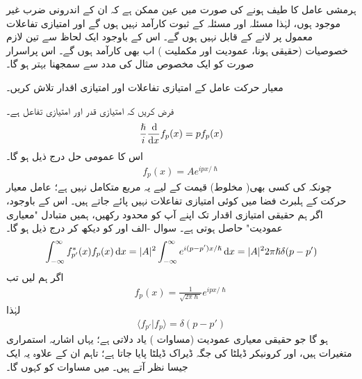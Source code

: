 ہرمشی عامل کا طیف  ہونے کی صورت میں عین ممکن ہے کہ ان کے اندرونی ضرب غیر موجود ہوں، لہٰذا مسئلہ  اور مسئلہ  کے ثبوت کارآمد نہیں ہوں گے اور امتیازی تفاعلات معمول پر لانے کے قابل نہیں ہوں گے۔ اس کے باوجود ایک لحاظ سے تین لازم خصوصیات (حقیقی ہونا، عمودیت اور مکملیت ) اب بھی کارآمد ہوں گے۔ اس پراسرار صورت کو ایک مخصوص مثال کی مدد سے سمجھنا بہتر ہو گا۔



معیار حرکت عامل کے امتیازی تفاعلات اور امتیازی اقدار تلاش کریں۔

\quad
فرض کریں کہ  امتیازی قدر اور  امتیازی تفاعل ہے۔
\begin{align}
\frac{\hslash}{i} \frac{\dif}{\dif x} f_{p}(x) = pf_{p}(x)
\end{align}
اس کا عمومی حل درج ذیل ہو گا۔
\begin{align*}
f_{p}(x) = Ae^{ipx/\hslash}
\end{align*}
چونکہ  کی کسی بھی( مخلوط) قیمت کے لیے یہ  مربع  متکامل  نہیں ہے؛ عامل معیار حرکت کے ہلبرٹ فضا میں کوئی امتیازی تفاعلات نہیں پائے جاتے ہیں۔ اس کے باوجود، اگر ہم حقیقی امتیازی اقدار تک اپنے آپ کو محدود رکھیں، ہمیں متبادل "معیاری عمودیت" حاصل ہوتی ہے۔ سوال -الف اور  کو دیکھ کر درج ذیل ہو گا۔
\begin{align}
\int_{-\infty}^{\infty} f_{p'}^{*}(x)f_{p}(x) \dif x = |A|^{2}\int_{-\infty}^{\infty}e^{i(p-p')x/\hslash} \dif x = |A|^{2}2\pi\hslash\delta(p-p')
\end{align}
اگر ہم  لیں تب 
\begin{align}\label{مساوات_قواعد_امتیازی_تفاعل_معیار_حرکت}
f_{p}(x) = \frac{1}{\sqrt{2\pi\hslash}}e^{ipx/\hslash}
\end{align}
 لہٰذا 
\begin{align}\label{مساوات_قواعد_ڈیراک_معیاری_عمودیت}
\langle f_{p'} | f_{p} \rangle = \delta(p-p')
\end{align}
ہو گا جو حقیقی معیاری عمودیت (مساوات  ) یاد دلاتی ہے؛ یہاں اشاریہ استمراری متغیرات ہیں، اور کرونیکر ڈیلٹا کی جگہ ڈیراک ڈیلٹا پایا جاتا ہے؛ تاہم ان کے علاوہ یہ ایک  جیسا نظر آتے ہیں۔ میں مساوات  کو  کہوں گا۔ 

